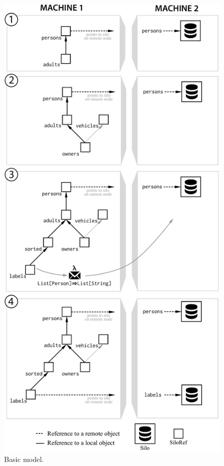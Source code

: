 \documentclass[preprint]{sigplanconf}
\theoremstyle{definition}
\theoremstyle{definition}
\begin{document}
\begin{figure}[t!]
\centering\includegraphics[width=\columnwidth]{bigger-dag.pdf}
\caption{Basic model.}\label{fig:bigger-dag}
\end{figure}
\end{document}
